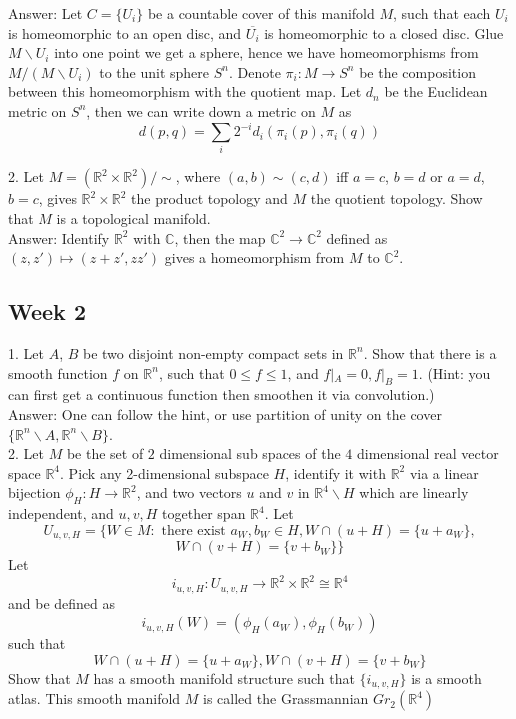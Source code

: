 \documentclass{article}
\theoremstyle{definition}
\begin{document}
Answer: Let $C=\{U_i\}$ be a countable cover of this manifold $M$, such that each $U_i$ is homeomorphic to an open disc, and $\overline{U_i}$ is homeomorphic to a closed disc. Glue $M\backslash U_i$ into one point we get a sphere, hence we have homeomorphisms from $M/(M\backslash U_i)$ to the unit sphere $S^n$. Denote $\pi_i: M\rightarrow S^n$ be the composition between this homeomorphism with the quotient map. Let $d_n$ be the Euclidean metric on $S^n$, then we can write down a metric on $M$ as 
\[d(p, q)=\sum_i 2^{-i}d_i(\pi_i(p), \pi_i(q))\]

2. Let $M=(\mathbb{R}^2\times\mathbb{R}^2)/\sim$, where $(a, b)\sim (c, d)$ iff $a=c$, $b=d$ or $a=d$, $b=c$, gives $\mathbb{R}^2\times\mathbb{R}^2$ the product topology and $M$ the quotient topology. Show that $M$ is a topological manifold.\\

Answer: Identify $\mathbb{R}^2$ with $\mathbb{C}$, then the map $\mathbb{C}^2\rightarrow \mathbb{C}^2$ defined as $(z, z')\mapsto (z+z', zz')$ gives a homeomorphism from $M$ to $\mathbb{C}^2$.

\newpage

\subsection{Week 2}

1. Let $A$, $B$ be two disjoint non-empty compact sets in $\mathbb{R}^n$. Show that there is a smooth function $f$ on $\mathbb{R}^n$, such that $0\leq f\leq 1$, and $f|_A=0, f|_B=1$. (Hint: you can first get a continuous function then smoothen it via convolution.)\\

Answer: One can follow the hint, or use partition of unity on the cover $\{\mathbb{R}^n\backslash A, \mathbb{R}^n\backslash B\}$.\\

2. Let $M$ be the set of $2$ dimensional sub spaces of the $4$ dimensional real vector space $\mathbb{R}^4$. Pick any 2-dimensional subspace $H$, identify it with $\mathbb{R}^2$ via a linear bijection $\phi_H: H\rightarrow \mathbb{R}^2$, and two vectors $u$ and $v$ in $\mathbb{R}^4\backslash H$ which are linearly independent, and $u, v, H$ together span $\mathbb{R}^4$. Let 
\[U_{u, v, H}=\{W\in M: \text{ there exist }a_W, b_W\in H, W\cap (u+H)=\{u+a_W\},\]
\[W\cap (v+H)=\{v+b_W\}\}\]
Let 
\[i_{u, v, H}: U_{u, v, H}\rightarrow \mathbb{R}^2\times \mathbb{R}^2\cong\mathbb{R}^4\]
and be defined as 
\[i_{u, v, H}(W)=(\phi_H(a_W), \phi_H(b_W))\]
such that
\[W\cap (u+H)=\{u+a_W\}, W\cap (v+H)=\{v+b_W\}\]
Show that $M$ has a smooth manifold structure such that $\{i_{u, v, H}\}$ is a smooth atlas. This smooth manifold $M$ is called the Grassmannian $Gr_2(\mathbb{R}^4)$\\
\end{document}
